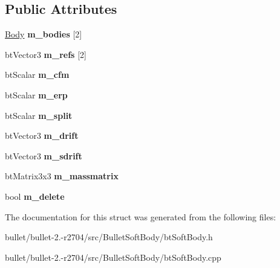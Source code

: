 \subsection*{Public Attributes}
\begin{DoxyCompactItemize}
\item 
\hypertarget{structbt_soft_body_1_1_joint_a8020996a1e17a05bb1f82b452858fef8}{\hyperlink{structbt_soft_body_1_1_body}{Body} {\bfseries m\+\_\+bodies} \mbox{[}2\mbox{]}}\label{structbt_soft_body_1_1_joint_a8020996a1e17a05bb1f82b452858fef8}

\item 
\hypertarget{structbt_soft_body_1_1_joint_abe0ba38a89d753938cbd6d3fece0a29a}{bt\+Vector3 {\bfseries m\+\_\+refs} \mbox{[}2\mbox{]}}\label{structbt_soft_body_1_1_joint_abe0ba38a89d753938cbd6d3fece0a29a}

\item 
\hypertarget{structbt_soft_body_1_1_joint_a4edd7242f07b07ee9912284d21b159f1}{bt\+Scalar {\bfseries m\+\_\+cfm}}\label{structbt_soft_body_1_1_joint_a4edd7242f07b07ee9912284d21b159f1}

\item 
\hypertarget{structbt_soft_body_1_1_joint_a9c5f5b382fcd0469b7b74bfa8abc9e9a}{bt\+Scalar {\bfseries m\+\_\+erp}}\label{structbt_soft_body_1_1_joint_a9c5f5b382fcd0469b7b74bfa8abc9e9a}

\item 
\hypertarget{structbt_soft_body_1_1_joint_a310e024b55848099960bd2c9878f13a7}{bt\+Scalar {\bfseries m\+\_\+split}}\label{structbt_soft_body_1_1_joint_a310e024b55848099960bd2c9878f13a7}

\item 
\hypertarget{structbt_soft_body_1_1_joint_a0619c879a22241b7225895a7e2ba3dec}{bt\+Vector3 {\bfseries m\+\_\+drift}}\label{structbt_soft_body_1_1_joint_a0619c879a22241b7225895a7e2ba3dec}

\item 
\hypertarget{structbt_soft_body_1_1_joint_a2178a6aa48eb0d56901f38d7301c6448}{bt\+Vector3 {\bfseries m\+\_\+sdrift}}\label{structbt_soft_body_1_1_joint_a2178a6aa48eb0d56901f38d7301c6448}

\item 
\hypertarget{structbt_soft_body_1_1_joint_aa82a5e3696e8d4f58b2b1a3391d51cec}{bt\+Matrix3x3 {\bfseries m\+\_\+massmatrix}}\label{structbt_soft_body_1_1_joint_aa82a5e3696e8d4f58b2b1a3391d51cec}

\item 
\hypertarget{structbt_soft_body_1_1_joint_a7eacf40a4cb57e30445e486b213a62ea}{bool {\bfseries m\+\_\+delete}}\label{structbt_soft_body_1_1_joint_a7eacf40a4cb57e30445e486b213a62ea}

\end{DoxyCompactItemize}


The documentation for this struct was generated from the following files\+:\begin{DoxyCompactItemize}
\item 
bullet/bullet-\/2.-\/r2704/src/\+Bullet\+Soft\+Body/bt\+Soft\+Body.\+h\item 
bullet/bullet-\/2.-\/r2704/src/\+Bullet\+Soft\+Body/bt\+Soft\+Body.\+cpp\end{DoxyCompactItemize}
